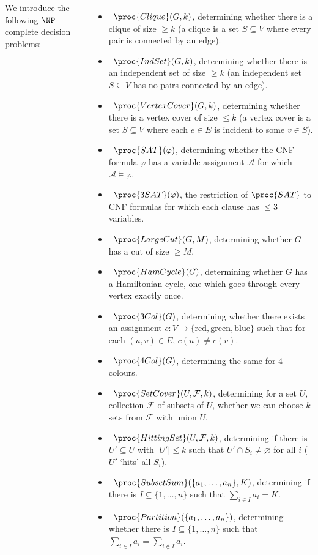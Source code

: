 \documentclass{tikzposter} %
\begin{document}
\begin{columns}
{  We introduce the following $\NP$-complete decision problems:
  \begin{itemize}
          \item \ $\proc{Clique}(G, k)$, determining whether there is a clique of size $\ge k$ (a clique is a set $S \subseteq V$ where every pair is connected by an edge).
          \item \ $\proc{IndSet}(G,k)$, determining whether there is an independent set of size $\ge k$ (an independent set $S \subseteq V$ has no pairs connected by an edge).
          \item \ $\proc{VertexCover}(G,k)$, determining whether there is a vertex cover of size $\le k$ (a vertex cover is a set $S \subseteq V$ where each $e \in E$ is incident to some $v \in S$).
          \item \ $\proc{SAT}(\varphi)$, determining whether the CNF formula $\varphi$ has a variable assignment $\mathcal{A}$ for which $\mathcal{A} \vDash \varphi$.
          \item \ $\proc{3SAT}(\varphi)$, the restriction of $\proc{SAT}$ to CNF formulas for which each clause has $\le 3$ variables.
          \item \ $\proc{LargeCut}(G, M)$, determining whether $G$ has a cut of size $\ge M$.
          \item \ $\proc{HamCycle}(G)$, determining whether $G$ has a Hamiltonian cycle, one which goes through every vertex exactly once.
          \item \ $\proc{3Col}(G)$, determining whether there exists an assignment $c : V \to \{\mathrm{red}, \mathrm{green}, \mathrm{blue}\}$ such that for each $(u,v) \in E$, $c(u) \neq c(v)$.
          \item \ $\proc{4Col}(G)$, determining the same for 4 colours.
          \item \ $\proc{SetCover}(U, \mathcal{F}, k)$, determining for a set $U$, collection $\mathcal{F}$ of subsets of $U$, whether we can choose $k$ sets from $\mathcal{F}$ with union $U$.
          \item \ $\proc{HittingSet}(U, \mathcal{F}, k)$, determining if there is $U' \subseteq U$ with $|U'| \le k$ such that $U' \cap S_{i} \neq \varnothing$ for all $i$ ($U'$ `hits' all $S_{i}$).
          \item \ $\proc{SubsetSum}(\{a_{1},\dots,a_{n}\}, K)$, determining if there is $I \subseteq \{1,\dots,n\}$ such that $\sum_{i \in I}a_{i} = K$.
          \item \ $\proc{Partition}(\{a_{1},\dots,a_{n}\})$, determining whether there is $I \subseteq \{1,\dots,n\}$ such that $\sum_{i \in I} a_{i} = \sum_{i \notin I} a_{i}$. \\
  \end{itemize}

}
\end{columns}
\end{document}
